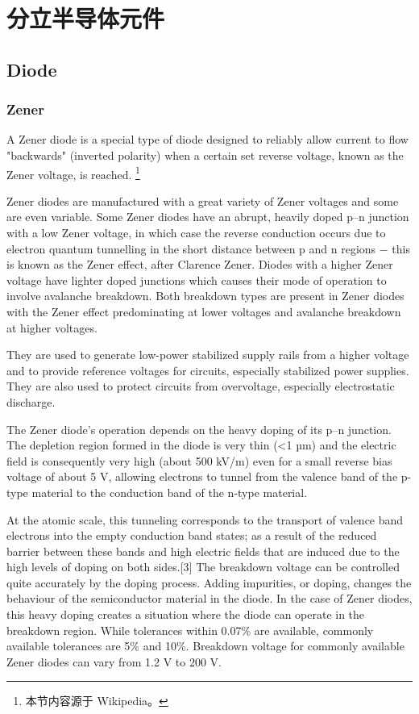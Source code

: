 \chapter{分立半导体元件}

\section{Diode}

\subsection{Zener}

A Zener diode is a special type of diode designed to reliably allow current to flow "backwards" (inverted polarity) when a certain set reverse voltage, known as the Zener voltage, is reached. \footnote{本节内容源于 Wikipedia。}

Zener diodes are manufactured with a great variety of Zener voltages and some are even variable. Some Zener diodes have an abrupt, heavily doped p–n junction with a low Zener voltage, in which case the reverse conduction occurs due to electron quantum tunnelling in the short distance between p and n regions − this is known as the Zener effect, after Clarence Zener. Diodes with a higher Zener voltage have lighter doped junctions which causes their mode of operation to involve avalanche breakdown. Both breakdown types are present in Zener diodes with the Zener effect predominating at lower voltages and avalanche breakdown at higher voltages.

They are used to generate low-power stabilized supply rails from a higher voltage and to provide reference voltages for circuits, especially stabilized power supplies. They are also used to protect circuits from overvoltage, especially electrostatic discharge.


The Zener diode's operation depends on the heavy doping of its p–n junction. The depletion region formed in the diode is very thin (<1 µm) and the electric field is consequently very high (about 500 kV/m) even for a small reverse bias voltage of about 5 V, allowing electrons to tunnel from the valence band of the p-type material to the conduction band of the n-type material.

At the atomic scale, this tunneling corresponds to the transport of valence band electrons into the empty conduction band states; as a result of the reduced barrier between these bands and high electric fields that are induced due to the high levels of doping on both sides.[3] The breakdown voltage can be controlled quite accurately by the doping process. Adding impurities, or doping, changes the behaviour of the semiconductor material in the diode. In the case of Zener diodes, this heavy doping creates a situation where the diode can operate in the breakdown region. While tolerances within 0.07\% are available, commonly available tolerances are 5\% and 10\%. Breakdown voltage for commonly available Zener diodes can vary from 1.2 V to 200 V.


